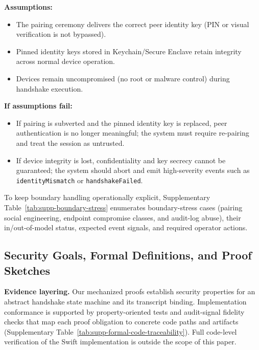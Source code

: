 \documentclass[10pt,journal,compsoc]{IEEEtran}
\providecommand{\tightlist}{%
  \setlength{\itemsep}{0pt}\setlength{\parskip}{0pt}}
\begin{document}
\textbf{Assumptions:}
\begin{itemize}\tightlist
\item
  The pairing ceremony delivers the correct peer identity key (PIN or
  visual verification is not bypassed).
\item
  Pinned identity keys stored in Keychain/Secure Enclave retain integrity
  across normal device operation.
\item
  Devices remain uncompromised (no root or malware control) during
  handshake execution.
\end{itemize}

\textbf{If assumptions fail:}
\begin{itemize}\tightlist
\item
  If pairing is subverted and the pinned identity key is replaced,
  peer authentication is no longer meaningful; the system must require
  re-pairing and treat the session as untrusted.
\item
  If device integrity is lost, confidentiality and key secrecy cannot be
  guaranteed; the system should abort and emit high-severity events such
  as \texttt{identity}\allowbreak\texttt{Mismatch} or
  \texttt{handshake}\allowbreak\texttt{Failed}.
\end{itemize}

To keep boundary handling operationally explicit, Supplementary
Table~\ref{tab:supp-boundary-stress} enumerates boundary-stress cases
(pairing social engineering, endpoint compromise classes, and audit-log
abuse), their in/out-of-model status, expected event signals, and
required operator actions.

\subsection{Security Goals, Formal Definitions, and Proof
Sketches}\label{b.-security-goals-and-proof-sketches}

\textbf{Evidence layering.} Our mechanized proofs establish security
properties for an abstract handshake state machine and its transcript
binding. Implementation conformance is supported by property-oriented
tests and audit-signal fidelity checks that map each proof obligation to
concrete code paths and artifacts (Supplementary
Table~\ref{tab:supp-formal-code-traceability}). Full code-level
verification of the Swift implementation is outside the scope of this
paper.
\end{document}
